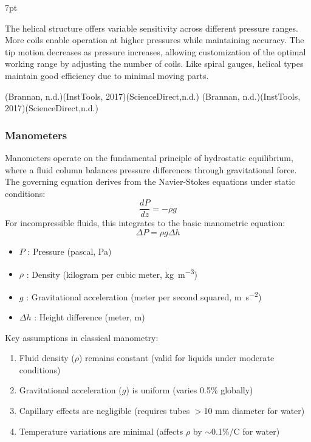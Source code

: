 \documentclass{article}
\newcommand{\formalsource}{} %
\newenvironment{formal}[3][]{%
	\renewcommand{\formalsource}{#1}%
	\def\FrameCommand{%
		\hspace{1pt}%
		{\color{#2}\vrule width 2pt}%
		{\color{#3}\vrule width 4pt}%
		\colorbox{#3}%
	}%
	\MakeFramed{\advance\hsize-\width\FrameRestore}%
	\noindent\hspace{-4.55pt}%
	\begin{adjustwidth}{}{7pt}%
		\vspace{2pt}%
	}%
	{%
		\vspace{4pt}%
		\ifx\formalsource\empty %
		\else
		\hfill{\footnotesize{\formalsource}}%
		\fi
	\end{adjustwidth}\endMakeFramed%
}
\newcommand{\wm}[2]{%
	\begin{minipage}{#1\textwidth}
		\centering
		#2
	\end{minipage}%
}
\begin{document}
\begin{formal}[(Brannan, n.d.)(InstTools, 2017)(ScienceDirect,n.d.)]{black!60!white}{white!93!gray}
\begin{itemize}
	The helical structure offers variable sensitivity across different pressure ranges. More coils enable operation at higher pressures while maintaining accuracy. The tip motion decreases as pressure increases, allowing customization of the optimal working range by adjusting the number of coils. Like spiral gauges, helical types maintain good efficiency due to minimal moving parts.
\end{itemize}
\end{formal}

\vspace{1em}
\subsubsection{Manometers}	

Manometers operate on the fundamental principle of hydrostatic equilibrium, where a fluid column balances pressure differences through gravitational force. The governing equation derives from the Navier-Stokes equations under static conditions:
\begin{equation}
	\frac{dP}{dz} = -\rho g
\end{equation}
\noindent 
For incompressible fluids, this integrates to the basic manometric equation:
\begin{equation}
	\Delta P = \rho g \Delta h
	\label{pressure}
\end{equation}
\begin{center}
\hspace{10em}\wm{0.7}{\centering
	\begin{itemize}[itemsep=-1mm,leftmargin=0cm]
		\item $P$ : Pressure (pascal, \si{\Pa})  
		\item $\rho$ : Density (kilogram per cubic meter, \si{\kg\per\m\cubed})  
		\item $g$ : Gravitational acceleration (meter per second squared, \si{\m\per\s\squared})  
		\item $\Delta h$ : Height difference (meter, \si{\m})
	\end{itemize}}
\end{center}
Key assumptions in classical manometry:
\begin{enumerate}
	\item Fluid density ($\rho$) remains constant (valid for liquids under moderate conditions)
	\item Gravitational acceleration ($g$) is uniform (varies 0.5\% globally)
	\item Capillary effects are negligible (requires tubes $>$10 mm diameter for water)
	\item Temperature variations are minimal (affects $\rho$ by $\sim$0.1\%/\textdegree C for water)
\end{enumerate}
\end{document}
